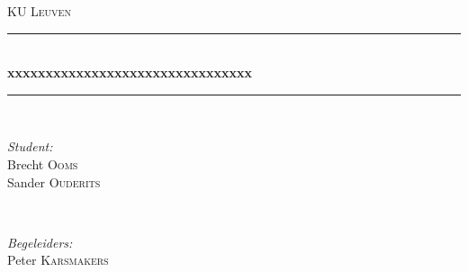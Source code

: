 
\begin{titlepage}

\newcommand{\HRule}{\rule{\linewidth}{0.5mm}} %

\center %


\textsc{\LARGE KU Leuven}\\[1.5cm] %



\HRule \\[0.4cm]
{ \huge \bfseries xxxxxxxxxxxxxxxxxxxxxxxxxxxxxxxx}\\[0.4cm] %
\HRule \\[1.5cm]


\begin{minipage}{0.4\textwidth}
\begin{flushleft} \large
\emph{Student:}\\
Brecht \textsc{Ooms} \\ %
Sander \textsc{Ouderits} %



\end{flushleft}
\end{minipage}
~
\begin{minipage}{0.4\textwidth}
\begin{flushright} \large
\emph{Begeleiders:} \\
Peter \textsc{Karsmakers} \\%


\end{flushright}
\end{minipage}\\[2cm]


\end{titlepage}
